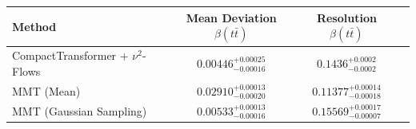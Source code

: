     \begin{tabular}{lccc}
        \toprule
        Method & Mean Deviation $\beta(t\bar{t})$ & Resolution $\beta(t\bar{t})$ \\
        \midrule
        CompactTransformer + $\nu^2$-Flows & $0.00446^{+0.00025}_{-0.00016}$ & $0.1436^{+0.0002}_{-0.0002}$ \\
        MMT (Mean) & $0.02910^{+0.00013}_{-0.00020}$ & $0.11377^{+0.00014}_{-0.00018}$ \\
        MMT (Gaussian Sampling) & $0.00533^{+0.00013}_{-0.00016}$ & $0.15569^{+0.00017}_{-0.00007}$ \\
        \bottomrule
    \end{tabular}